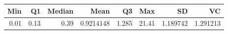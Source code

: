 
\begin{tabular}[t]{rrrrrrrr}
\toprule
Min & Q1 & Median & Mean & Q3 & Max & SD & VC\\
\midrule
0.01 & 0.13 & 0.39 & 0.9214148 & 1.285 & 21.41 & 1.189742 & 1.291213\\
\bottomrule
\end{tabular}